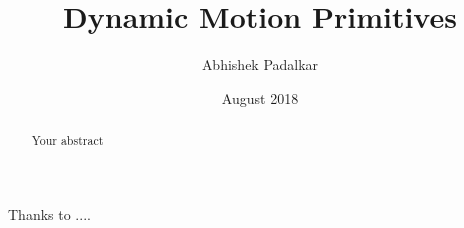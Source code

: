 \documentclass[rnd]{mas_report}
\author{Abhishek Padalkar}
\title{Dynamic Motion Primitives}
\date{August 2018}
\begin{document}
\begin{titlepage}	
    \maketitle
\end{titlepage}


\pagestyle{plain}


\cleardoublepage
\statementpage

\begin{abstract}
Your abstract
\end{abstract}


\begin{acknowledgements}
Thanks to ....
\end{acknowledgements}


\tableofcontents
\listoffigures
\listoftables


\mainmatter %

\pagestyle{mainmatter}











\begin{appendices}


\end{appendices}

\backmatter

\end{document}
